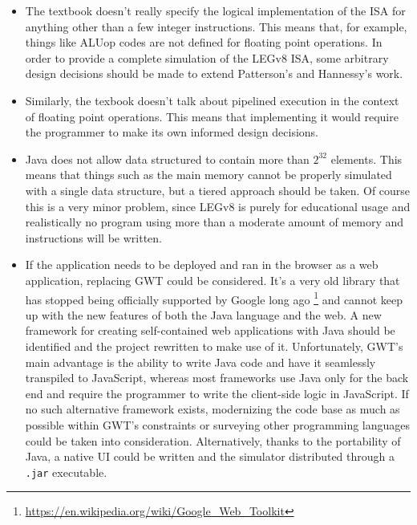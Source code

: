 \begin{itemize}
 	\item The textbook doesn't really specify the logical implementation of the ISA for anything other than a few integer instructions. This means that, for example, things like ALUop codes are not defined for floating point operations. In order to provide a complete simulation of the LEGv8 ISA, some arbitrary design decisions should be made to extend Patterson's and Hannessy's work.
 	\item Similarly, the texbook doesn't talk about pipelined execution in the context of floating point operations. This means that implementing it would require the programmer to make its own informed design decisions.
 	\item Java does not allow data structured to contain more than $2^{32}$ elements. This means that things such as the main memory cannot be properly simulated with a single data structure, but a tiered approach should be taken. Of course this is a very minor problem, since LEGv8 is purely for educational usage and realistically no program using more than a moderate amount of memory and instructions will be written.
 	\item If the application needs to be deployed and ran in the browser as a web application, replacing GWT could be considered. It's a very old library that has stopped being officially supported by Google long ago \footnote{\url{https://en.wikipedia.org/wiki/Google_Web_Toolkit}} and cannot keep up with the new features of both the Java language and the web. A new framework for creating self-contained web applications with Java should be identified and the project rewritten to make use of it. Unfortunately, GWT's main advantage is the ability to write Java code and have it seamlessly transpiled to JavaScript, whereas most frameworks use Java only for the back end and require the programmer to write the client-side logic in JavaScript. If no such alternative framework exists, modernizing the code base as much as possible within GWT's constraints or surveying other programming languages  could be taken into consideration. Alternatively, thanks to the portability of Java, a native UI could be written and the simulator distributed through a \verb|.jar| executable.
\end{itemize}

